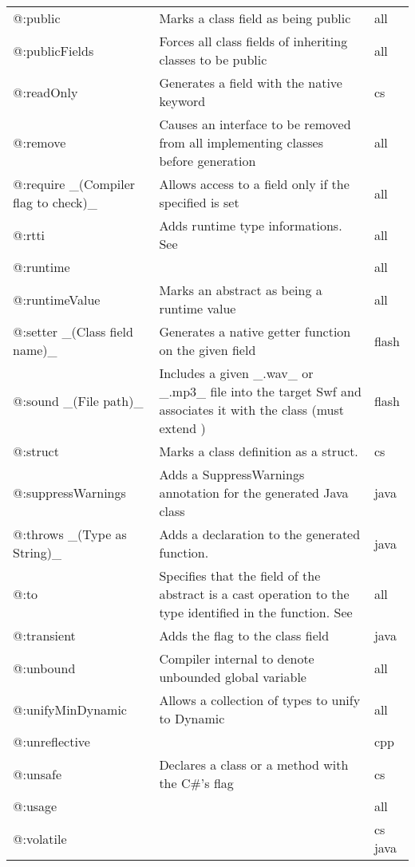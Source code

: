 \begin{center}
\begin{tabular}{| l | l | l |}
	@:public  &  Marks a class field as being public  &  all \\
	@:publicFields  &  Forces all class fields of inheriting classes to be public  &  all \\
	@:readOnly  &  Generates a field with the \expr{readonly} native keyword   &  cs \\
	@:remove  &  Causes an interface to be removed from all implementing classes before generation  &  all \\
	@:require \_(Compiler flag to check)\_  &  Allows access to a field only if the specified \tref{compiler flag}{lf-condition-compilation} is set  &  all \\
	@:rtti   &  Adds runtime type informations. See \tref{RTTI}{cr-rtti}  &  all \\
	@:runtime  &    &  all \\
	@:runtimeValue  &  Marks an abstract as being a runtime value  &  all \\
	@:setter \_(Class field name)\_  &  Generates a native getter function on the given field   &  flash \\
	@:sound \_(File path)\_  &  Includes a given \_.wav\_ or \_.mp3\_ file into the target Swf and associates it with the class (must extend \expr{flash.media.Sound})  &  flash \\
	@:struct  &  Marks a class definition as a struct.   &  cs \\
	@:suppressWarnings  &  Adds a SuppressWarnings annotation for the generated Java class  &  java \\
	@:throws \_(Type as String)\_  &  Adds a \expr{throws} declaration to the generated function.   &  java \\
	@:to  &  Specifies that the field of the abstract is a cast operation to the type identified in the function. See \tref{Implicit Casts}{types-abstract-implicit-casts} & all \\
	@:transient  &  Adds the \expr{transient} flag to the class field  &  java \\
	@:unbound  &  Compiler internal to denote unbounded global variable  &  all \\
	@:unifyMinDynamic  &  Allows a collection of types to unify to Dynamic  &  all \\
	@:unreflective  &    &  cpp \\
	@:unsafe  &  Declares a class  or a method with the C\#'s \expr{unsafe} flag   &  cs \\
	@:usage  &    &  all \\
	@:volatile  &    &  cs  java \\
\end{tabular}
\end{center}

